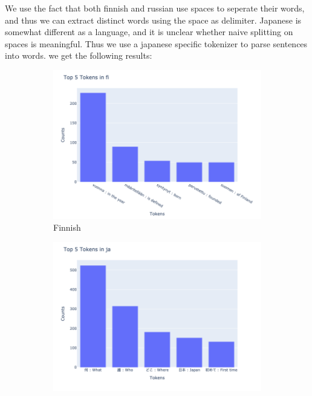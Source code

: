 \documentclass[11pt]{article}
\begin{document}
\begin{enumerate}
    We use the fact that both finnish and russian use spaces to seperate their words, and thus we can extract distinct words using the space as delimiter.
    Japanese is somewhat different as a language, and it is unclear whether naive splitting on spaces is meaningful. Thus we use a japanese specific tokenizer to parse sentences into words.
    we get the following results:

    \begin{figure}[t]
        \centering
        \begin{subfigure}[b]{0.1\textwidth}
            \centering
            \includegraphics[width=\textwidth]{week1_b_top_5_tokens_fi.png}
            \caption{Finnish}
            \label{fig:top_5_tokens_fi}
        \end{subfigure}
        \hfill
        \begin{subfigure}[b]{0.1\textwidth}
            \centering
            \includegraphics[width=\textwidth]{week1_b_top_5_tokens_ja.png}

\end{subfigure}
\end{figure}
\end{enumerate}
\end{document}
